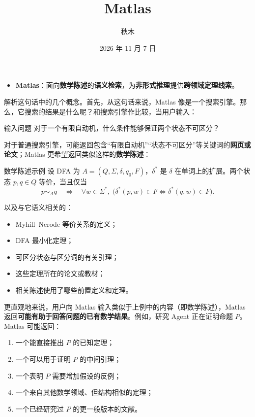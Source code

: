 \documentclass[11pt,a4paper]{ctexart}
\title{Matlas}
\author{秋木}
\date{2026 年 11 月 7 日}
\begin{document}
\maketitle

\begin{itemize}
  \item \textbf{Matlas}：面向\textbf{数学陈述}的\textbf{语义检索}，为\textbf{非形式推理}提供\textbf{跨领域定理线索}。
\end{itemize}

解析这句话中的几个概念。首先，从这句话来说，Matlas 像是一个搜索引擎。那么，它搜索的结果是什么呢？和搜索引擎作比较，当用户输入：

\begin{statementbox}{输入问题}
对于一个有限自动机，什么条件能够保证两个状态不可区分？
\end{statementbox}

对于普通搜索引擎，可能返回包含“有限自动机”“状态不可区分”等关键词的\textbf{网页或论文}；Matlas 更希望返回类似这样的\textbf{数学陈述}：

\begin{statementbox}{数学陈述示例}
设 DFA 为 $A=(Q,\Sigma,\delta,q_0,F)$，$\delta^{\ast}$ 是 $\delta$ 在单词上的扩展。两个状态 $p,q\in Q$ 等价，当且仅当
\[
p\sim_A q
\quad\Longleftrightarrow\quad
\forall w\in\Sigma^{\ast},\;
\bigl(\delta^{\ast}(p,w)\in F
\iff
\delta^{\ast}(q,w)\in F\bigr).
\]
\end{statementbox}

以及与它语义相关的：

\begin{itemize}
  \item Myhill--Nerode 等价关系的定义；
  \item DFA 最小化定理；
  \item 可区分状态与区分词的有关引理；
  \item 这些定理所在的论文或教材；
  \item 相关陈述使用了哪些前置定义和定理。
\end{itemize}

更直观地来说，用户向 Matlas 输入类似于上例中的内容（即数学陈述），Matlas 返回\textbf{可能有助于回答问题的已有数学结果}。例如，研究 Agent 正在证明命题 $P$。Matlas 可能返回：

\begin{enumerate}
  \item 一个能直接推出 $P$ 的已知定理；
  \item 一个可以用于证明 $P$ 的中间引理；
  \item 一个表明 $P$ 需要增加假设的反例；
  \item 一个来自其他数学领域、但结构相似的定理；
  \item 一个已经研究过 $P$ 的更一般版本的文献。
\end{enumerate}
\end{document}

